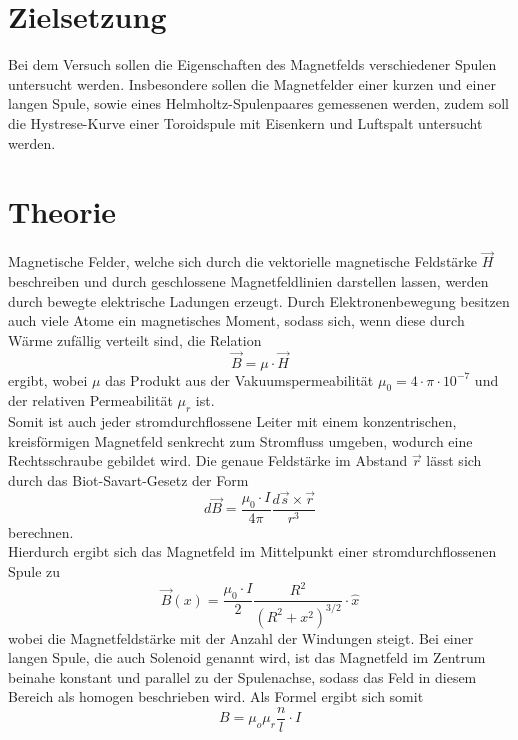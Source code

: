\section{Zielsetzung}
  Bei dem Versuch sollen die Eigenschaften des Magnetfelds verschiedener Spulen untersucht werden.
  Insbesondere sollen die Magnetfelder einer kurzen und einer langen Spule, sowie eines
  Helmholtz-Spulenpaares gemessenen werden, zudem soll die Hystrese-Kurve einer Toroidspule
  mit Eisenkern und Luftspalt untersucht werden.
\section{Theorie}

Magnetische Felder, welche sich durch die vektorielle magnetische Feldstärke
$\vec{H}$ beschreiben und durch geschlossene Magnetfeldlinien darstellen lassen,
werden durch bewegte elektrische Ladungen erzeugt.
Durch Elektronenbewegung besitzen auch viele Atome ein magnetisches Moment, sodass
sich, wenn diese durch Wärme zufällig verteilt sind, die Relation
\begin{equation}
  \vec{B} = \mu \cdot \vec{H}
  \label{eqn:B1}
\end{equation} ergibt, wobei $ \mu $ das Produkt aus der Vakuumspermeabilität
$ \mu_0 = 4 \cdot \pi \cdot 10^{-7}$ und der relativen Permeabilität $ \mu_r $ ist. \\

\noindent Somit ist auch jeder stromdurchflossene Leiter mit einem konzentrischen,
kreisförmigen Magnetfeld senkrecht zum Stromfluss umgeben, wodurch eine Rechtsschraube gebildet wird.
Die genaue Feldstärke im Abstand $\vec{r}$ lässt sich durch das Biot-Savart-Gesetz
der Form
\begin{equation}
  d\vec{B} = \frac{\mu _0 \cdot I}{4\pi} \frac{d \vec{s} \times \vec{r}}{r^3}
  \label{eqn:Biot}
\end{equation}
berechnen. \\
\noindent Hierdurch ergibt sich das Magnetfeld im Mittelpunkt einer stromdurchflossenen Spule zu
\begin{equation}
  \vec{B}(x) = \frac{\mu_0 \cdot I}{2} \frac{R^2}{(R^2+x^2)^{3/2}} \cdot \hat{x}
  \label{eqn:Biot2}
\end{equation}
wobei die Magnetfeldstärke %
mit der Anzahl der Windungen steigt.
Bei einer langen Spule, die auch Solenoid genannt wird, ist das Magnetfeld im
Zentrum beinahe konstant und parallel zu der Spulenachse, sodass das Feld in diesem
Bereich als homogen beschrieben wird.
Als Formel ergibt sich somit
\begin{equation}
  B= \mu_o \mu_r \frac{n}{l} \cdot I
  \label{eqn:langespule}
\end{equation} \\

